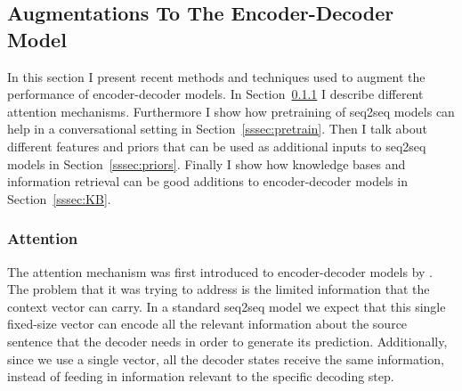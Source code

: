 \documentclass[12pt]{article}
\begin{document}
\subsection{Augmentations To The Encoder-Decoder Model} \label{ssec:32}
In this section I present recent methods and techniques used to augment the performance of encoder-decoder models. In Section~\ref{sssec:attention} I describe different attention mechanisms. Furthermore I show how pretraining of seq2seq models can help in a conversational setting in Section~\ref{sssec:pretrain}. Then I talk about different features and priors that can be used as additional inputs to seq2seq models in Section~\ref{sssec:priors}. Finally I show how knowledge bases and information retrieval can be good additions to encoder-decoder models in Section~\ref{sssec:KB}.

\subsubsection{Attention} \label{sssec:attention}
The attention mechanism was first introduced to encoder-decoder models by \cite{Bahdanau:2014}. The problem that it was trying to address is the limited information that the context vector can carry. In a standard seq2seq model we expect that this single fixed-size vector can encode all the relevant information about the source sentence that the decoder needs in order to generate its prediction. Additionally, since we use a single vector, all the decoder states receive the same information, instead of feeding in information relevant to the specific decoding step. 
\end{document}
